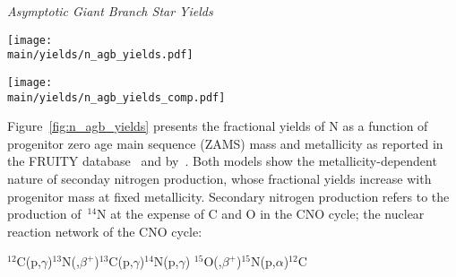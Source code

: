 \documentclass[\main/notes.tex]{subfiles}
\begin{document}
\twolineskip 
{\Large \textit{Asymptotic Giant Branch Star Yields}} 
\par\noindent 

\begin{figure*}
\centering 
\texttt{[image: \\main/yields/n\_agb\_yields.pdf]} 
\caption{Fractional yields of N as a function of progenitor zero age main 
sequence mass at the metallicities at which~\citet{Cristallo2011} (left) and 
\citet{Karakas2010} report yields.} 
\label{fig:n_agb_yields} 
\end{figure*} 

\begin{figure*} 
\centering 
\texttt{[image: \\main/yields/n\_agb\_yields\_comp.pdf]} 
\caption{The same as figure~\ref{fig:n_agb_yields}, but with the 
\citet{Cristallo2011} (solid) and~\citet{Karakas2010} yields plotted on the 
same set of axes for comparison. } 
\label{fig:n_agb_yields_comp} 
\end{figure*} 

Figure~\ref{fig:n_agb_yields} presents the fractional yields of N as a function 
of progenitor zero age main sequence (ZAMS) mass and metallicity as reported in 
the FRUITY database~\citep{Cristallo2011} and by~\citet{Karakas2010}. Both 
models show the metallicity-dependent nature of seconday nitrogen production, 
whose fractional yields increase with progenitor mass at fixed metallicity. 
Secondary nitrogen production refers to the production of~$^{14}$N at the 
expense of C and O in the CNO cycle; the nuclear reaction network of the CNO 
cycle: 

\twolineskip 
$^{12}$C(p,$\gamma$)$^{13}$N(,$\beta^+$)$^{13}$C(p,$\gamma$)$^{14}$N(p,$\gamma$)
$^{15}$O(,$\beta^+$)$^{15}$N(p,$\alpha$)$^{12}$C 
\end{document}

